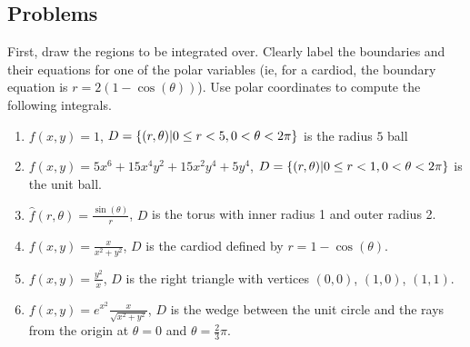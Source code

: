 \documentclass[letterpaper,11pt]{article}
\begin{document}
\subsection*{Problems}
First, draw the regions to be integrated over.
Clearly label the boundaries and their equations for one of the polar variables (ie, for a cardiod, the boundary equation is $r = 2 (1 - \cos(\theta))$).
Use polar coordinates to compute the following integrals.
\begin{enumerate}
  \item $f(x, y) = 1$, $D = \{ (r, \theta) | 0 \leq r < 5, 0 < \theta < 2 \pi \}$ is the radius $5$ ball\\
    \newline
    \newline
    \newline
    \newline
    \newline
  \item $f(x, y) = 5 x^6 + 15 x^4 y^2 + 15 x^2 y^4 + 5 y^4$, $D = \{ (r, \theta) | 0 \leq r < 1, 0 < \theta < 2 \pi \}$ is the unit ball.
    \newline
    \newline
    \newline
    \newline
    \newline
  \item $\hat{f}(r, \theta) = \frac{\sin(\theta)}{r}$, $D$ is the torus with inner radius 1 and outer radius 2.
    \newline
    \newline
    \newline
    \newline
    \newline
  \item $f(x, y) = \frac{x}{x^2 + y^2}$, $D$ is the cardiod defined by $r = 1 - \cos(\theta)$.
    \newline
    \newline
    \newline
    \newline
    \newline
  \item $f(x, y) = \frac{y^2}{x}$, $D$ is the right triangle with vertices $(0, 0)$, $(1, 0)$, $(1, 1)$.
    \newline
    \newline
    \newline
    \newline
    \newline
  \item $f(x, y) = e^{x^2} \frac{x}{\sqrt{x^2 + y^2}}$,
    $D$ is the wedge between the unit circle and the rays from the origin at $\theta = 0$ and $\theta = \frac{2}{3} \pi$.
    \newline
    \newline
    \newline
    \newline
    \newline
\end{enumerate}
\end{document}
